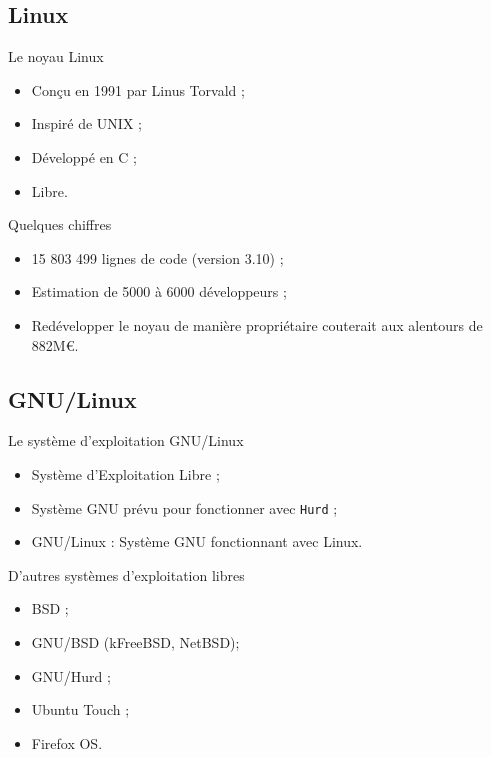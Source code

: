 \subsection{Linux}

\begin{frame}{Le noyau Linux}
  \begin{itemize}
    \item Conçu en 1991 par Linus Torvald ;
    \item Inspiré de UNIX ;
    \item Développé en C ;
    \item Libre.
  \end{itemize}
\end{frame}

\begin{frame}{Quelques chiffres}
  \begin{itemize}
    \item 15 803 499 lignes de code (version 3.10) ;
    \item Estimation de 5000 à 6000 développeurs ;
    \item Redévelopper le noyau de manière propriétaire couterait aux alentours de 882M€.
  \end{itemize}
\end{frame}

\subsection{GNU/Linux}

\begin{frame}{Le système d'exploitation GNU/Linux}
  \begin{itemize}
    \item Système d'Exploitation Libre ;
    \item Système GNU prévu pour fonctionner avec \texttt{Hurd} ;
    \item GNU/Linux : Système GNU fonctionnant avec Linux.
  \end{itemize}
\end{frame}

\begin{frame}{D'autres systèmes d'exploitation libres}
  \begin{itemize}
    \item BSD ;
    \item GNU/BSD (kFreeBSD, NetBSD);
    \item GNU/Hurd ;
    \item Ubuntu Touch ;
    \item Firefox OS.
  \end{itemize}
\end{frame}

